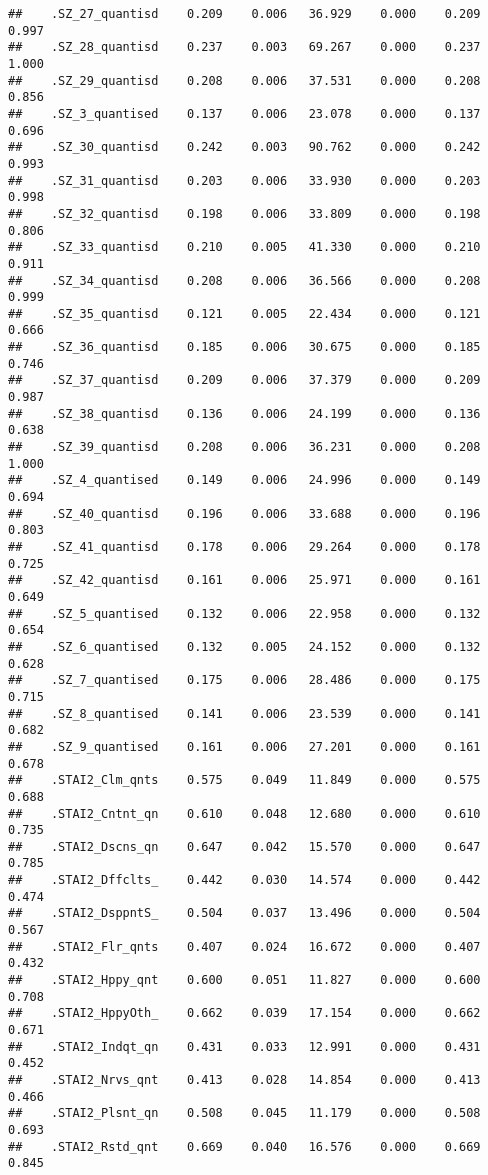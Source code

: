 \documentclass[]{article}
\begin{document}
\begin{verbatim}
##    .SZ_27_quantisd    0.209    0.006   36.929    0.000    0.209    0.997
##    .SZ_28_quantisd    0.237    0.003   69.267    0.000    0.237    1.000
##    .SZ_29_quantisd    0.208    0.006   37.531    0.000    0.208    0.856
##    .SZ_3_quantised    0.137    0.006   23.078    0.000    0.137    0.696
##    .SZ_30_quantisd    0.242    0.003   90.762    0.000    0.242    0.993
##    .SZ_31_quantisd    0.203    0.006   33.930    0.000    0.203    0.998
##    .SZ_32_quantisd    0.198    0.006   33.809    0.000    0.198    0.806
##    .SZ_33_quantisd    0.210    0.005   41.330    0.000    0.210    0.911
##    .SZ_34_quantisd    0.208    0.006   36.566    0.000    0.208    0.999
##    .SZ_35_quantisd    0.121    0.005   22.434    0.000    0.121    0.666
##    .SZ_36_quantisd    0.185    0.006   30.675    0.000    0.185    0.746
##    .SZ_37_quantisd    0.209    0.006   37.379    0.000    0.209    0.987
##    .SZ_38_quantisd    0.136    0.006   24.199    0.000    0.136    0.638
##    .SZ_39_quantisd    0.208    0.006   36.231    0.000    0.208    1.000
##    .SZ_4_quantised    0.149    0.006   24.996    0.000    0.149    0.694
##    .SZ_40_quantisd    0.196    0.006   33.688    0.000    0.196    0.803
##    .SZ_41_quantisd    0.178    0.006   29.264    0.000    0.178    0.725
##    .SZ_42_quantisd    0.161    0.006   25.971    0.000    0.161    0.649
##    .SZ_5_quantised    0.132    0.006   22.958    0.000    0.132    0.654
##    .SZ_6_quantised    0.132    0.005   24.152    0.000    0.132    0.628
##    .SZ_7_quantised    0.175    0.006   28.486    0.000    0.175    0.715
##    .SZ_8_quantised    0.141    0.006   23.539    0.000    0.141    0.682
##    .SZ_9_quantised    0.161    0.006   27.201    0.000    0.161    0.678
##    .STAI2_Clm_qnts    0.575    0.049   11.849    0.000    0.575    0.688
##    .STAI2_Cntnt_qn    0.610    0.048   12.680    0.000    0.610    0.735
##    .STAI2_Dscns_qn    0.647    0.042   15.570    0.000    0.647    0.785
##    .STAI2_Dffclts_    0.442    0.030   14.574    0.000    0.442    0.474
##    .STAI2_DsppntS_    0.504    0.037   13.496    0.000    0.504    0.567
##    .STAI2_Flr_qnts    0.407    0.024   16.672    0.000    0.407    0.432
##    .STAI2_Hppy_qnt    0.600    0.051   11.827    0.000    0.600    0.708
##    .STAI2_HppyOth_    0.662    0.039   17.154    0.000    0.662    0.671
##    .STAI2_Indqt_qn    0.431    0.033   12.991    0.000    0.431    0.452
##    .STAI2_Nrvs_qnt    0.413    0.028   14.854    0.000    0.413    0.466
##    .STAI2_Plsnt_qn    0.508    0.045   11.179    0.000    0.508    0.693
##    .STAI2_Rstd_qnt    0.669    0.040   16.576    0.000    0.669    0.845

\end{verbatim}
\end{document}
